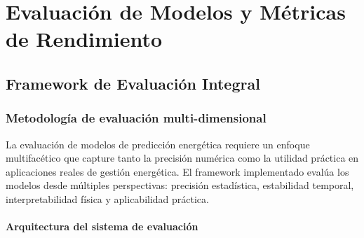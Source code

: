 \chapter{Evaluación de Modelos y Métricas de Rendimiento}
\label{ch:evaluation_metrics}

\section{Framework de Evaluación Integral}

\subsection{Metodología de evaluación multi-dimensional}

La evaluación de modelos de predicción energética requiere un enfoque multifacético que capture tanto la precisión numérica como la utilidad práctica en aplicaciones reales de gestión energética. El framework implementado evalúa los modelos desde múltiples perspectivas: precisión estadística, estabilidad temporal, interpretabilidad física y aplicabilidad práctica.

\subsubsection{Arquitectura del sistema de evaluación}

